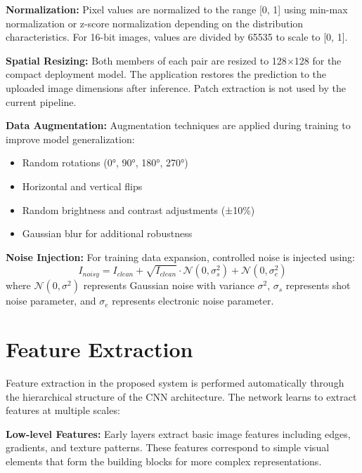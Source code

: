 \documentclass[12pt,a4paper]{report}
\begin{document}
\textbf{Normalization:} Pixel values are normalized to the range [0, 1] using min-max normalization or z-score normalization depending on the distribution characteristics. For 16-bit images, values are divided by 65535 to scale to [0, 1].

\vspace{0.5cm}

\textbf{Spatial Resizing:} Both members of each pair are resized to 128$\times$128 for the compact deployment model. The application restores the prediction to the uploaded image dimensions after inference. Patch extraction is not used by the current pipeline.

\vspace{0.5cm}

\textbf{Data Augmentation:} Augmentation techniques are applied during training to improve model generalization:
\begin{itemize}
    \item Random rotations (0°, 90°, 180°, 270°)
    \item Horizontal and vertical flips
    \item Random brightness and contrast adjustments (±10\%)
    \item Gaussian blur for additional robustness
\end{itemize}

\vspace{0.5cm}

\textbf{Noise Injection:} For training data expansion, controlled noise is injected using:
\begin{equation}
I_{noisy} = I_{clean} + \sqrt{I_{clean}} \cdot \mathcal{N}(0, \sigma_s^2) + \mathcal{N}(0, \sigma_e^2)
\end{equation}
where $\mathcal{N}(0, \sigma^2)$ represents Gaussian noise with variance $\sigma^2$, $\sigma_s$ represents shot noise parameter, and $\sigma_e$ represents electronic noise parameter.

\section{Feature Extraction}

Feature extraction in the proposed system is performed automatically through the hierarchical structure of the CNN architecture. The network learns to extract features at multiple scales:

\vspace{0.5cm}

\textbf{Low-level Features:} Early layers extract basic image features including edges, gradients, and texture patterns. These features correspond to simple visual elements that form the building blocks for more complex representations.
\end{document}
